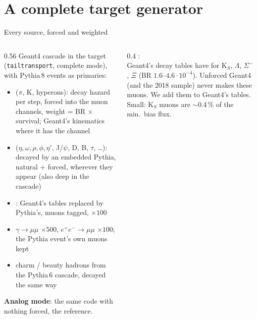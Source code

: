 \documentclass[aspectratio=169,10pt]{beamer}
\begin{document}
\section{A complete target generator}

\begin{frame}{Every source, forced and weighted}
  \begin{columns}[c]
    \begin{column}{0.56\textwidth}\footnotesize
      Geant4 cascade in the target (\texttt{tailtransport}, complete mode), with Pythia\,8 events as primaries:
      \begin{itemize}\footnotesize
        \item {} ($\pi$, K, hyperons): decay hazard per step, forced into the muon channels, weight = BR $\times$ survival; Geant4's kinematics where it has the channel
        \item {} ($\eta,\omega,\rho,\phi,\eta'$, J/$\psi$, D, B, $\tau$, \dots): decayed by an embedded Pythia, natural + forced, wherever they appear (also deep in the cascade)
        \item {}: Geant4's tables replaced by Pythia's, muons tagged, $\times100$
        \item $\gamma\to\mu\mu$ $\times500$, $e^+e^-\to\mu\mu$ $\times100$; the Pythia event's own muons kept
        \item charm / beauty hadrons from the Pythia\,6 cascade, decayed the same way
      \end{itemize}
      \textbf{Analog mode}: the same code with nothing forced, the reference.
    \end{column}
    \begin{column}{0.4\textwidth}\footnotesize
      :\\[1mm]
      Geant4's decay tables have  for K$_S$, $\Lambda$, $\Sigma^-$, $\Xi$ (BR $1.6$--$4.6\cdot10^{-4}$). Unforced Geant4 (and the 2018 sample) never makes these muons. We add them to Geant4's tables.\\[2mm]
      Small: K$_S$ muons are $\sim$0.4\,\% of the min.\ bias flux.\\[2mm]
    \end{column}
  \end{columns}
\end{frame}
\end{document}
